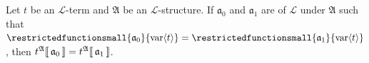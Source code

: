 \begin{thm}
     \label{thm:first-order-language-different-variable-assignment-functions-yield-the-same-interpretation-if-they-agree-for-all-variable-symbols-in-a-term}
    Let \( t \) be an \( \mathcal{L} \)-term and \( \mathfrak{A} \) be an \( \mathcal{L} \)-structure.
    If \( \mathfrak{a}_{0} \) and \( \mathfrak{a}_{1} \) are 
    of \( \mathcal{L} \) under \( \mathfrak{A} \) such that
    \( \restrictedfunctionsmall{\mathfrak{a}_{0}}{\folvars{t}} = \restrictedfunctionsmall{\mathfrak{a}_{1}}{\folvars{t}} \),
    then \( t^{\mathfrak{A}}\llbracket\, \mathfrak{a}_{0} \,\rrbracket = t^{\mathfrak{A}}\llbracket\, \mathfrak{a}_{1} \,\rrbracket \).
\end{thm}

